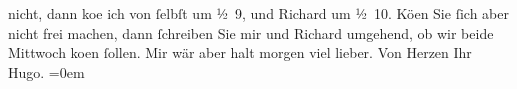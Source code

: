 \begin{ledgroupsized}[t]{13cm}
               nicht, dann ko{\geminationm}e ich von ſelbſt um ½ 9, und
                  Richard um ½ 10. Kö{\geminationn}en Sie ſich aber nicht frei machen, dann ſchreiben Sie
               mir und Richard umgehend, ob wir beide
                  Mittwoch ko{\geminationm}en ſollen. Mir wär aber halt
               morgen viel lieber.\pend
           \pstart
           Von Herzen Ihr{\\[\baselineskip]}\spacefill\mbox{Hugo.}\pend
           \leftskip=0em{}\endnumbering{}\end{ledgroupsized}  \newcommand{\dateiname}{L00881}\newcommand{\titel}{Hugo von Hofmannsthal an Arthur Schnitzler, [16. 1. 1899]}\newcommand{\editorInnen}{Martin Anton Müller und Gerd-Hermann Susen}
      